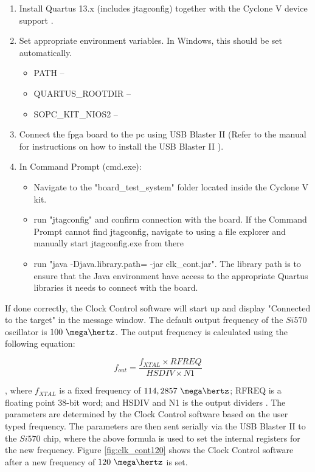 \documentclass[main.tex]{subfiles}
\begin{document}
\begin{enumerate}
  \item Install Quartus 13.x (includes jtagconfig) together with the Cyclone V device support \cite{altera_q13}.
  \item Set appropriate environment variables. In Windows, this should be set automatically.
  \begin{itemize}
      \item PATH -- 
      \item QUARTUS\_ROOTDIR -- 
      \item SOPC\_KIT\_NIOS2 -- 
    \end{itemize}
  \item Connect the \gls{fpga} board to the \gls{pc} using USB Blaster II (Refer to the manual for instructions on how to install the USB Blaster II \cite{altera_usb}).
  \item In Command Prompt (cmd.exe):
  \begin{itemize}
      \item Navigate to the "board\_test\_system" folder located inside the Cyclone V kit.
      \item run "jtagconfig" and confirm connection with the board. If the Command Prompt cannot find jtagconfig, navigate to  using a file explorer and manually start jtagconfig.exe from there
      \item run "java -Djava.library.path= -jar clk\_cont.jar". The library path is to ensure that the Java environment have access to the appropriate Quartus libraries it needs to connect with the board.
    \end{itemize}
\end{enumerate}

If done correctly, the Clock Control software will start up and display "Connected to the target" in the message window. The default output frequency of the $Si570$ oscillator is $100~\mega\hertz$. The output frequency is calculated using the following equation:

\begin{equation}
    f_{out} = \frac{f_{XTAL} \times RFREQ}{HSDIV \times N1}
\end{equation} 

, where $f_{XTAL}$ is a fixed frequency of $114,2857~\mega\hertz$; RFREQ is a floating point 38-bit word; and HSDIV and N1 is the output dividers \cite{si570}. The parameters are determined by the Clock Control software based on the user typed frequency. The parameters are then sent serially via the USB Blaster II to the $Si570$ chip, where the above formula is used to set the internal registers for the new frequency.
Figure \ref{fig:clk_cont120} shows the Clock Control software after a new frequency of $120~\mega\hertz$ is set. 
\end{document}
